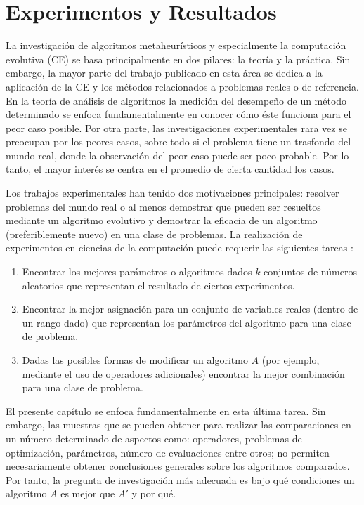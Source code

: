 \chapter{Experimentos y Resultados} \label{Chapter7}

La investigación de algoritmos metaheurísticos y especialmente la computación evolutiva (CE) se basa principalmente en dos pilares: la teoría y la práctica. Sin embargo, la mayor parte del trabajo publicado en esta área se dedica a la aplicación de la CE y los métodos relacionados a problemas reales o de referencia. En la teoría de análisis de algoritmos la medición del desempeño de un método determinado se enfoca fundamentalmente en conocer cómo éste funciona para el peor caso posible. Por otra parte, las investigaciones experimentales rara vez se preocupan por los peores casos, sobre todo si el problema tiene un trasfondo del mundo real, donde la observación del peor caso puede ser poco probable. Por lo tanto, el mayor interés se centra en el promedio de cierta cantidad los casos.

 Los trabajos experimentales han tenido dos motivaciones principales: resolver problemas del mundo real o al menos demostrar que pueden ser resueltos mediante un algoritmo evolutivo y demostrar la eficacia de un algoritmo (preferiblemente nuevo) en una clase de problemas. La realización de experimentos en ciencias de la computación puede requerir las siguientes tareas \cite{BartzBeielstein2014ExperimentalAO}:
\begin{enumerate}
	\item Encontrar los mejores parámetros o algoritmos dados $k$ conjuntos de números aleatorios que representan el resultado de ciertos experimentos.
	\item  Encontrar la mejor asignación para un conjunto de variables reales (dentro de un rango dado) que representan los parámetros del algoritmo para una clase de problema.
	\item Dadas las posibles formas de modificar un algoritmo $A$ (por ejemplo, mediante el uso de operadores adicionales) encontrar la mejor combinación para una clase de problema.
\end{enumerate}
El presente capítulo se enfoca fundamentalmente en esta última tarea. Sin embargo, las muestras que se pueden obtener para realizar las comparaciones en un número determinado de aspectos como: operadores, problemas de optimización, parámetros, número de evaluaciones entre otros; no permiten necesariamente obtener conclusiones generales sobre los algoritmos comparados. Por tanto, la pregunta de investigación más adecuada es bajo qué condiciones  un algoritmo $A$ es mejor que $A'$ y por qué. 

